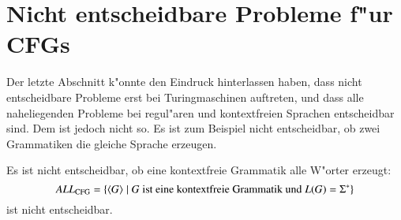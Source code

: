 \section{Nicht entscheidbare Probleme f"ur CFGs}
Der letzte Abschnitt k"onnte den Eindruck hinterlassen haben,
dass nicht entscheidbare Probleme erst bei Turingmaschinen
auftreten, und dass alle naheliegenden Probleme bei regul"aren
und kontextfreien Sprachen entscheidbar sind. Dem ist jedoch
nicht so. Es ist zum Beispiel nicht entscheidbar, ob zwei
Grammatiken die gleiche Sprache erzeugen.

\begin{satz} Es ist nicht entscheidbar, ob eine kontextfreie
Grammatik alle W"orter erzeugt:
\[
\text{\it ALL}_{\text{CFG}}=\{\langle G\rangle\;|\; \text{$G$
ist eine kontextfreie Grammatik und $L(G)=\Sigma^*$}\}
\]
ist nicht entscheidbar.
\end{satz}

